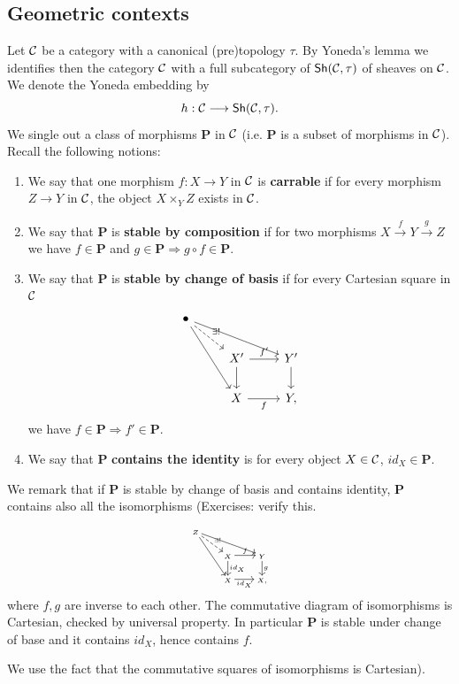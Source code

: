 \documentclass{tufte-book} %
\numberwithin{dummy}{section}
\newcommand{\calc}{{\cal C}}
\newcommand{\Lrta}{\Longrightarrow}
\newcommand{\lrta}{\longrightarrow}
\newcommand{\bfp}{\mathbf{P}}
\begin{document}
\subsection{Geometric contexts}
Let $\calc$ be a category with a canonical (pre)topology $\tau$. By Yoneda's lemma we identifies then the category $\calc$ with a full subcategory of $\mathsf{Sh}(\calc,\tau)$ of sheaves on $\calc$. We  denote the Yoneda embedding by 
$$
h:\calc\lrta \mathsf{Sh}(\calc,\tau).
$$
We single out a class of morphisms $\mathbf{P}$ in $\calc$ (i.e. $\mathbf{P}$ is a subset of morphisms in $\calc$). Recall the following notions:
\begin{enumerate}
\item We say that one morphism $f:X\lrta Y$ in $\calc$ is \textbf{carrable} if for every morphism $Z\lrta Y$ in $\calc$, the object $X\times_Y Z$ exists in $\calc$.
\item We say that $\mathbf{P}$ is \textbf{stable by composition} if for two morphisms $X\overset{f}{\lrta}Y\overset{g}{\lrta }Z$ we have $f\in \mathbf{P}$ and $g\in \mathbf{P}\Lrta g\circ f\in \mathbf{P}$.
\item We say that $\bfp$ is \textbf{stable by change of basis} if for every Cartesian square in $\calc$
$$
\begin{tikzcd}
\bullet \arrow[rdd] \arrow[rrd] \arrow[rd, "\exists!", dashed] &  &  \\
 & X' \arrow[r, "f'"] \arrow[d] & Y' \arrow[d] \\
 & X \arrow[r, "f"'] & Y,
\end{tikzcd}
$$
we have $f\in \bfp\Lrta f'\in \bfp$.
\item We say that $\bfp$ \textbf{contains the identity} is for every object $X\in \calc$, $id_X\in \bfp$.
\end{enumerate}
We remark that if $\bfp$ is stable by change of basis and contains identity, $\bfp$ contains also all the isomorphisms (Exercises: verify this.{\color{gray}\begin{marginfigure}
$$
\tiny
\begin{tikzcd}
Z \arrow[rdd] \arrow[rrd] \arrow[rd, "\exists !", dashed] &  &  \\
 & X \arrow[r, "f"] \arrow[d, "id_X"] & Y \arrow[d, "g"] \\
 & X \arrow[r, "id_X"'] & X,
\end{tikzcd}
$$
where $f,g$ are inverse to each other.
The commutative diagram of isomorphisms is Cartesian, checked by universal property. In particular $\bfp$ is stable under change of base and it contains $id_X$, hence contains $f$.
\end{marginfigure}
} We use the fact that the commutative squares of isomorphisms is Cartesian).
\end{document}
